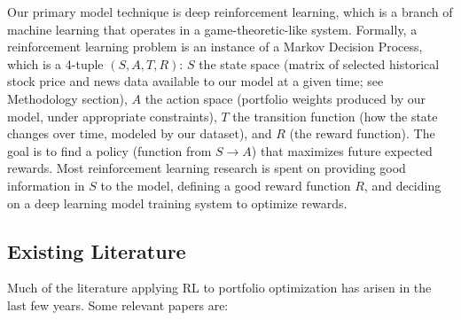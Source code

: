 Our primary model technique is deep reinforcement learning, which is a 
branch of machine learning that operates in a game-theoretic-like system. 
Formally, a reinforcement learning problem is an instance of a Markov 
Decision Process, which is a 4-tuple $(S, A, T, R)$: $S$ the state space 
(matrix of selected historical stock price and news data available to 
our model at a given time; see Methodology section), $A$ the action space 
(portfolio weights produced by our model, under appropriate constraints), 
$T$ the transition function (how the state changes over time, modeled by our dataset), 
and $R$ (the reward function). The goal is to find a policy (function from $S \to A$) 
that maximizes future expected rewards. Most reinforcement learning research is 
spent on providing good information in $S$ to the model, defining a good reward 
function $R$, and deciding on a deep learning model training system to optimize rewards.

\subsection{Existing Literature}

Much of the literature applying RL to portfolio optimization has arisen in the 
last few years. Some relevant papers are:

